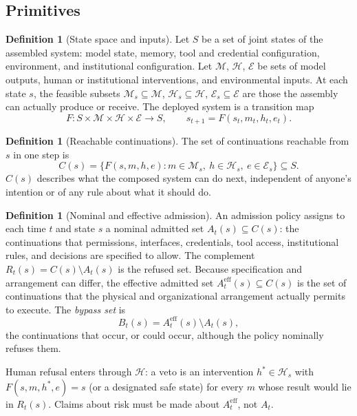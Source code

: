 \documentclass[11pt]{article}
\theoremstyle{definition}
\newtheorem{definition}[theorem]{Definition}
\begin{document}
\subsection{Primitives}

\begin{definition}[State space and inputs]
Let $S$ be a set of joint states of the assembled system: model state, memory, tool and credential configuration, environment, and institutional configuration. Let $\mathcal{M}$, $\mathcal{H}$, $\mathcal{E}$ be sets of model outputs, human or institutional interventions, and environmental inputs. At each state $s$, the feasible subsets $\mathcal{M}_s\subseteq\mathcal{M}$, $\mathcal{H}_s\subseteq\mathcal{H}$, $\mathcal{E}_s\subseteq\mathcal{E}$ are those the assembly can actually produce or receive. The deployed system is a transition map
\[
F:S\times\mathcal{M}\times\mathcal{H}\times\mathcal{E}\to S,\qquad s_{t+1}=F(s_t,m_t,h_t,e_t).
\]
\end{definition}

\begin{definition}[Reachable continuations]
The set of continuations reachable from $s$ in one step is
\[
C(s)=\{F(s,m,h,e): m\in\mathcal{M}_s,\ h\in\mathcal{H}_s,\ e\in\mathcal{E}_s\}\subseteq S .
\]
$C(s)$ describes what the composed system can do next, independent of anyone's intention or of any rule about what it should do.
\end{definition}

\begin{definition}[Nominal and effective admission]
An admission policy assigns to each time $t$ and state $s$ a nominal admitted set $A_t(s)\subseteq C(s)$: the continuations that permissions, interfaces, credentials, tool access, institutional rules, and decisions are specified to allow. The complement $R_t(s)=C(s)\setminus A_t(s)$ is the refused set. Because specification and arrangement can differ, the effective admitted set $A_t^{\mathrm{eff}}(s)\subseteq C(s)$ is the set of continuations that the physical and organizational arrangement actually permits to execute. The \emph{bypass set} is
\[
B_t(s)=A_t^{\mathrm{eff}}(s)\setminus A_t(s),
\]
the continuations that occur, or could occur, although the policy nominally refuses them.
\end{definition}

Human refusal enters through $\mathcal{H}$: a veto is an intervention $h^\ast\in\mathcal{H}_s$ with $F(s,m,h^\ast,e)=s$ (or a designated safe state) for every $m$ whose result would lie in $R_t(s)$. Claims about risk must be made about $A_t^{\mathrm{eff}}$, not $A_t$.
\end{document}
